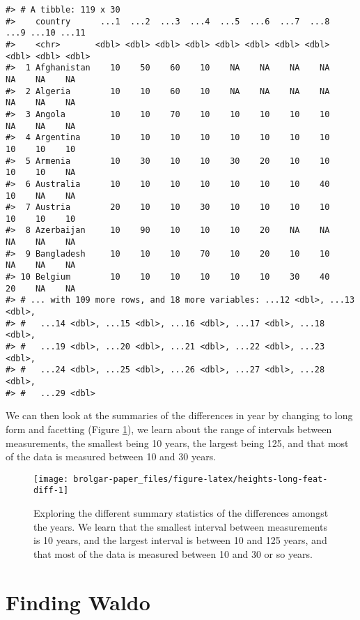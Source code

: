\begin{verbatim}
#> # A tibble: 119 x 30
#>    country      ...1  ...2  ...3  ...4  ...5  ...6  ...7  ...8  ...9 ...10 ...11
#>    <chr>       <dbl> <dbl> <dbl> <dbl> <dbl> <dbl> <dbl> <dbl> <dbl> <dbl> <dbl>
#>  1 Afghanistan    10    50    60    10    NA    NA    NA    NA    NA    NA    NA
#>  2 Algeria        10    10    60    10    NA    NA    NA    NA    NA    NA    NA
#>  3 Angola         10    10    70    10    10    10    10    10    NA    NA    NA
#>  4 Argentina      10    10    10    10    10    10    10    10    10    10    10
#>  5 Armenia        10    30    10    10    30    20    10    10    10    10    NA
#>  6 Australia      10    10    10    10    10    10    10    40    10    NA    NA
#>  7 Austria        20    10    10    30    10    10    10    10    10    10    10
#>  8 Azerbaijan     10    90    10    10    10    20    NA    NA    NA    NA    NA
#>  9 Bangladesh     10    10    10    70    10    20    10    10    NA    NA    NA
#> 10 Belgium        10    10    10    10    10    10    30    40    20    NA    NA
#> # ... with 109 more rows, and 18 more variables: ...12 <dbl>, ...13 <dbl>,
#> #   ...14 <dbl>, ...15 <dbl>, ...16 <dbl>, ...17 <dbl>, ...18 <dbl>,
#> #   ...19 <dbl>, ...20 <dbl>, ...21 <dbl>, ...22 <dbl>, ...23 <dbl>,
#> #   ...24 <dbl>, ...25 <dbl>, ...26 <dbl>, ...27 <dbl>, ...28 <dbl>,
#> #   ...29 <dbl>
\end{verbatim}

We can then look at the summaries of the differences in year by changing to long form and facetting (Figure \ref{fig:heights-long-feat-diff}), we learn about the range of intervals between measurements, the smallest being 10 years, the largest being 125, and that most of the data is measured between 10 and 30 years.

\begin{figure}

{\centering \texttt{[image: brolgar-paper\_files/figure-latex/heights-long-feat-diff-1]} 

}

\caption{Exploring the different summary statistics of the differences amongst the years. We learn that the smallest interval between measurements is 10 years, and the largest interval is between 10 and 125 years, and that most of the data is measured between 10 and 30 or so years.}\label{fig:heights-long-feat-diff}
\end{figure}

\hypertarget{finding-waldo}{%
\section{Finding Waldo}\label{finding-waldo}}

